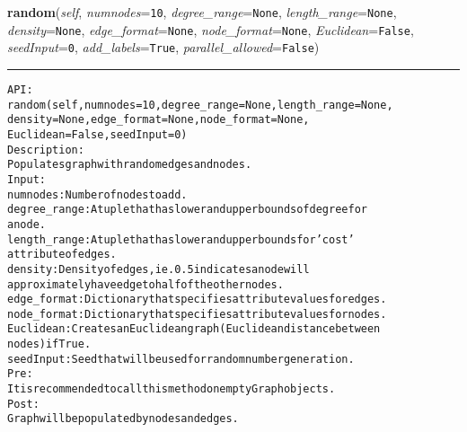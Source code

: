 \hspace{.8\funcindent}\begin{boxedminipage}{\funcwidth}

    \raggedright \textbf{random}(\textit{self}, \textit{numnodes}={\tt 10}, \textit{degree\_range}={\tt None}, \textit{length\_range}={\tt None}, \textit{density}={\tt None}, \textit{edge\_format}={\tt None}, \textit{node\_format}={\tt None}, \textit{Euclidean}={\tt False}, \textit{seedInput}={\tt 0}, \textit{add\_labels}={\tt True}, \textit{parallel\_allowed}={\tt False})

    \vspace{-1.5ex}

    \rule{\textwidth}{0.5\fboxrule}
\setlength{\parskip}{2ex}
\begin{alltt}

API:
    random(self, numnodes = 10, degree\_range = None, length\_range = None,
       density = None, edge\_format = None, node\_format = None,
       Euclidean = False, seedInput = 0)
Description:
    Populates graph with random edges and nodes.
Input:
    numnodes: Number of nodes to add.
    degree\_range: A tuple that has lower and upper bounds of degree for
    a node.
    length\_range: A tuple that has lower and upper bounds for 'cost'
    attribute of edges.
    density: Density of edges, ie. 0.5 indicates a node will
    approximately have edge to half of the other nodes.
    edge\_format: Dictionary that specifies attribute values for edges.
    node\_format: Dictionary that specifies attribute values for nodes.
    Euclidean: Creates an Euclidean graph (Euclidean distance between
    nodes) if True.
    seedInput: Seed that will be used for random number generation.
Pre:
    It is recommended to call this method on empty Graph objects.
Post:
    Graph will be populated by nodes and edges.
\end{alltt}

\setlength{\parskip}{1ex}
    \end{boxedminipage}

    \label{coinor:gimpy:graph:Graph:relabel}

    \vspace{0.5ex}

